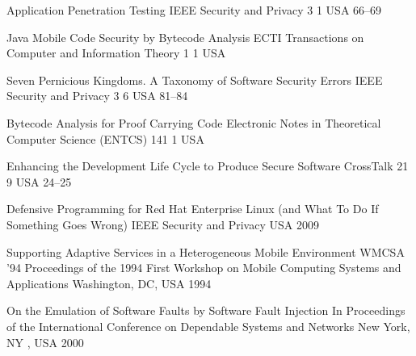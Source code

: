 \begin{thebibliography}{9}
		{}
		{Application Penetration Testing}
		{{IEEE} Security and Privacy}
		{3}
		{1}
		{USA}
		{}
		{66--69}
	
		{
			\BibAnd
			\BibAnd
			\BibAnd
			}
		{Java Mobile Code Security by Bytecode Analysis}
		{{ECTI} Transactions on Computer and Information Theory}
		{1}
		{1}
		{USA}
		{}
		{}
	
		{
			\BibAnd
			\BibAnd
			}
		{Seven Pernicious Kingdoms. A Taxonomy of Software Security Errors}
		{{IEEE} Security and Privacy}
		{3}
		{6}
		{USA}
		{}
		{81--84}
	
		{
			\BibAnd
			\BibAnd
			}
		{Bytecode Analysis for Proof Carrying Code}
		{Electronic Notes in Theoretical Computer Science ({ENTCS})}
		{141}
		{1}
		{USA}
		{}
		{}
	
		{}
		{Enhancing the Development Life Cycle to Produce Secure Software}
		{CrossTalk}
		{21}
		{9}
		{USA}
		{}
		{24--25}
	
		{}
		{Defensive Programming for {R}ed {H}at {E}nterprise {L}inux (and What To Do If Something Goes Wrong)}
		{{IEEE} Security and Privacy}
		{}
		{}
		{USA}
		{2009}
		{}
		

		{
			\BibAnd
			\BibAnd
			\BibAnd
			}
		{Supporting Adaptive Services in a Heterogeneous Mobile Environment}
		{WMCSA '94 Proceedings of the 1994 First Workshop on Mobile Computing Systems and Applications}
		{Washington, DC, USA}
		{1994}
		
		{
			\BibAnd
			\BibAnd
			}
		{On the Emulation of Software Faults by Software Fault Injection}
		{In Proceedings of the International Conference on Dependable Systems and Networks}
		{New York, NY , USA}
		{2000}
	

\end{thebibliography}
